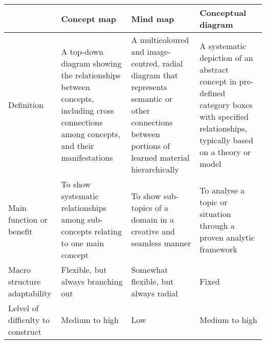         \begin{table}[]
            \centering
            \begin{tabular}{p{}p{}p{}p{}}
                \hline
                                  & Concept map                                                                                                                         & Mind map                                                                                                                                            & Conceptual diagram                                                                                                                             \\ \hline
                Definition                        & A top-down diagram showing the relationships between concepts, including cross connections among concepts, and their manifestations & A multicoloured and image-centred, radial diagram that represents semantic or other connections between portions of learned material hierarchically & A systematic depiction of an abstract concept in pre-defined category boxes with specified relationships, typically based on a theory or model \\
                Main function or benefit          & To show systematic relationships among sub-concepts relating to one main concept                                                    & To show sub-topics of a domain in a creative and seamless manner                                                                                    & To analyse a topic or situation through a proven analytic framework                                                                            \\
                Macro structure adaptability      & Flexible, but always branching out                                                                                                  & Somewhat flexible, but always radial                                                                                                                & Fixed                                                                                                                                          \\
                Lelvel of difficulty to construct & Medium to high                                                                                                                      & Low                                                                                                                                                 & Medium to high                                                                                                                                 \\

\end{tabular}
\end{table}
